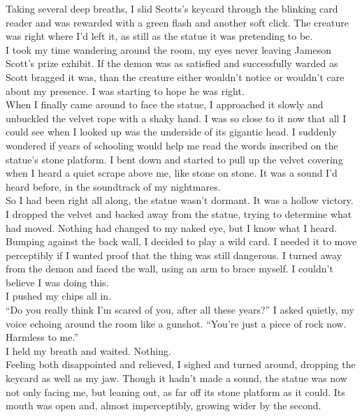 \documentclass[a5paper]{scrartcl}
\begin{document}
Taking several deep breaths, I slid Scotts's keycard through the blinking card reader and was rewarded with a green flash and another soft click. The creature was right where I'd left it, as still as the statue it was pretending to be. \\


I took my time wandering around the room, my eyes never leaving Jameson Scott's prize exhibit. If the demon was as satisfied and successfully warded as Scott bragged it was, than the creature either wouldn't notice or wouldn't care about my presence.  I was starting to hope he was right. \\


When I finally came around to face the statue, I approached it slowly and unbuckled the velvet rope with a shaky hand. I was so close to it now that all I could see when I looked up was the underside of its gigantic head. I suddenly wondered if years of schooling would help me read the words inscribed on the statue's stone platform. I bent down and started to pull up the velvet covering when I heard a quiet scrape above me, like stone on stone. It was a sound I'd heard before, in the soundtrack of my nightmares.\\


So I had been right all along, the statue wasn't dormant. It was a hollow victory. I dropped the velvet and backed away from the statue, trying to determine what had moved. Nothing had changed to my naked eye, but I know what I heard.\\


Bumping against the back wall, I decided to play a wild card. I needed it to move perceptibly if I wanted proof that the thing was still dangerous. I turned away from the demon and faced the wall, using an arm to brace myself. I couldn't believe I was doing this.\\

I pushed my chips all in. \\


\enquote{Do you really think I'm scared of you, after all these years?} I asked quietly, my voice echoing around the room like a gunshot. \enquote{You're just a piece of rock now. Harmless to me.} \\


I held my breath and waited. Nothing.\\


Feeling both disappointed and relieved, I sighed and turned around, dropping the keycard as well as my jaw. Though it hadn't made a sound, the statue was now not only facing me, but leaning out, as far off its stone platform as it could. Its mouth was open and, almost imperceptibly, growing wider by the second. \\
\end{document}
